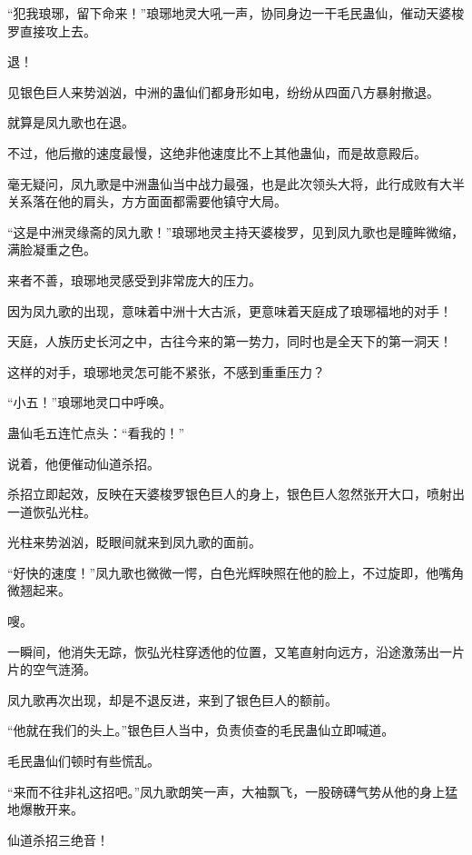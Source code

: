 
\begin{this_body}



“犯我琅琊，留下命来！”琅琊地灵大吼一声，协同身边一干毛民蛊仙，催动天婆梭罗直接攻上去。

退！

见银色巨人来势汹汹，中洲的蛊仙们都身形如电，纷纷从四面八方暴射撤退。

就算是凤九歌也在退。

不过，他后撤的速度最慢，这绝非他速度比不上其他蛊仙，而是故意殿后。

毫无疑问，凤九歌是中洲蛊仙当中战力最强，也是此次领头大将，此行成败有大半关系落在他的肩头，方方面面都需要他镇守大局。

“这是中洲灵缘斋的凤九歌！”琅琊地灵主持天婆梭罗，见到凤九歌也是瞳眸微缩，满脸凝重之色。

来者不善，琅琊地灵感受到非常庞大的压力。

因为凤九歌的出现，意味着中洲十大古派，更意味着天庭成了琅琊福地的对手！

天庭，人族历史长河之中，古往今来的第一势力，同时也是全天下的第一洞天！

这样的对手，琅琊地灵怎可能不紧张，不感到重重压力？

“小五！”琅琊地灵口中呼唤。

蛊仙毛五连忙点头：“看我的！”

说着，他便催动仙道杀招。

杀招立即起效，反映在天婆梭罗银色巨人的身上，银色巨人忽然张开大口，喷射出一道恢弘光柱。

光柱来势汹汹，眨眼间就来到凤九歌的面前。

“好快的速度！”凤九歌也微微一愕，白色光辉映照在他的脸上，不过旋即，他嘴角微翘起来。

嗖。

一瞬间，他消失无踪，恢弘光柱穿透他的位置，又笔直射向远方，沿途激荡出一片片的空气涟漪。

凤九歌再次出现，却是不退反进，来到了银色巨人的额前。

“他就在我们的头上。”银色巨人当中，负责侦查的毛民蛊仙立即喊道。

毛民蛊仙们顿时有些慌乱。

“来而不往非礼这招吧。”凤九歌朗笑一声，大袖飘飞，一股磅礴气势从他的身上猛地爆散开来。

仙道杀招三绝音！


\end{this_body}
